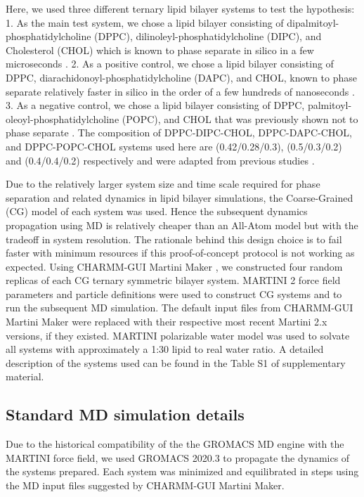 \documentclass{biophys-new}
\begin{document}
Here, we used three different ternary lipid bilayer systems to test the hypothesis:
1. As the main test system, we chose a lipid bilayer consisting of dipalmitoyl-phosphatidylcholine (DPPC), dilinoleyl-phosphatidylcholine
(DIPC), and Cholesterol (CHOL) which is known to phase separate in silico in a few microseconds \cite{Risselada2008,Schafer2010,Janosi2012,Doma2012,Jong2013,Liu2020,Su2020}.
2. As a positive control, we chose a lipid bilayer consisting of DPPC, diarachidonoyl-phosphatidylcholine (DAPC), and CHOL, known to phase separate relatively faster in silico in the order of a few hundreds of nanoseconds \cite{Lin2016,Lin2019,Davis2013a}.
3. As a negative control, we chose a lipid bilayer consisting of DPPC, palmitoyl-oleoyl-phosphatidylcholine (POPC), and CHOL that was previously shown not to
phase separate \cite{Veatch2003,Davis2013a}.
The composition of DPPC-DIPC-CHOL, DPPC-DAPC-CHOL, and DPPC-POPC-CHOL systems used here are (0.42/0.28/0.3),
(0.5/0.3/0.2) and (0.4/0.4/0.2) respectively and were adapted from previous studies \cite{Risselada2008,Lin2016,Davis2013a}.

Due to the relatively larger system size and time scale required for phase separation and related dynamics in lipid bilayer simulations, the Coarse-Grained (CG) model of 
each system was used.
Hence the subsequent dynamics propagation using MD is relatively cheaper than an All-Atom model but with the tradeoff in system resolution.
The rationale behind this design choice is to fail faster with minimum resources if this proof-of-concept protocol is not working as expected. 
Using CHARMM-GUI Martini Maker \cite{Qi2015}, we constructed four random replicas of each CG ternary symmetric bilayer system.
MARTINI 2 force field parameters and particle definitions\cite{Marrink2007,DeJong2013} were used to construct CG systems and to run the subsequent MD simulation. 
The default input files from CHARMM-GUI Martini Maker were replaced with their respective most recent Martini 2.x versions, if they existed.
MARTINI polarizable water model\cite{Yesylevskyy2010} was used to solvate all systems with approximately a 1:30 lipid to real water ratio.
A detailed description of the systems used can be found in the Table S1 of supplementary material.

\subsection*{Standard MD simulation details}

Due to the historical compatibility of the the GROMACS MD engine with the MARTINI force field, we used GROMACS 2020.3\cite{Abraham2015} to propagate the dynamics of the systems prepared. 
Each system was minimized and equilibrated in steps using the MD input files suggested by CHARMM-GUI Martini Maker.
\end{document}
